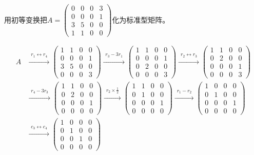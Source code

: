 \documentclass[a4paper]{report}
\begin{document}
\hphantom{~~}

\EX 用初等变换把$
A=
\begin{pmatrix}
0&0&0&3\\
0&0&0&1\\
3&5&0&0\\
1&1&0&0
\end{pmatrix}
$化为标准型矩阵。

\begin{jie}
\begin{align*}
A&\xrightarrow{\substack{r_{1}\leftrightarrow r_{4}}}
{
\begin{pmatrix}
1&1&0&0\\
0&0&0&1\\
3&5&0&0\\
0&0&0&3
\end{pmatrix}
}\xrightarrow{\substack{r_{3}-3r_{1}}}
{
\begin{pmatrix}
1&1&0&0\\
0&0&0&1\\
0&2&0&0\\
0&0&0&3
\end{pmatrix}
}\xrightarrow{\substack{r_{2}\leftrightarrow r_{3}}}
{
\begin{pmatrix}
1&1&0&0\\
0&2&0&0\\
0&0&0&1\\
0&0&0&3
\end{pmatrix}
}\\ &\xrightarrow{\substack{r_{4}-3r_{3}}}
{
\begin{pmatrix}
1&1&0&0\\
0&2&0&0\\
0&0&0&1\\
0&0&0&0
\end{pmatrix}
}\xrightarrow{\substack{r_{2}\times \frac{1}{2}}}
{
\begin{pmatrix}
1&1&0&0\\
0&1&0&0\\
0&0&0&1\\
0&0&0&0
\end{pmatrix}
}\xrightarrow{\substack{r_{1}-r_{2}}}
{
\begin{pmatrix}
1&0&0&0\\
0&1&0&0\\
0&0&0&1\\
0&0&0&0
\end{pmatrix}
}\\ &\xrightarrow{\substack{c_{3}\leftrightarrow c_{4}}}
{
\begin{pmatrix}
1&0&0&0\\
0&1&0&0\\
0&0&1&0\\
0&0&0&0
\end{pmatrix}
}
\end{align*}
\end{jie}
\end{document}
